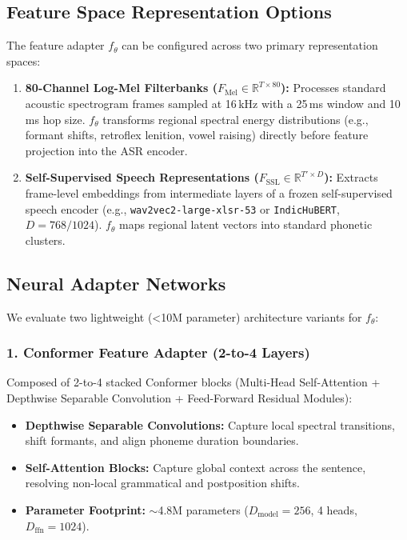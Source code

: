 \documentclass[11pt]{article}
\begin{document}
\subsection{Feature Space Representation Options}
The feature adapter $f_\theta$ can be configured across two primary representation spaces:
\begin{enumerate}[leftmargin=*]
  \item \textbf{80-Channel Log-Mel Filterbanks ($F_{\text{Mel}} \in \mathbb{R}^{T \times 80}$):}
    Processes standard acoustic spectrogram frames sampled at 16\,kHz with a 25\,ms window and 10\,ms hop size. $f_\theta$ transforms regional spectral energy distributions (e.g., formant shifts, retroflex lenition, vowel raising) directly before feature projection into the ASR encoder.
  \item \textbf{Self-Supervised Speech Representations ($F_{\text{SSL}} \in \mathbb{R}^{T' \times D}$):}
    Extracts frame-level embeddings from intermediate layers of a frozen self-supervised speech encoder (e.g., \texttt{wav2vec2-large-xlsr-53} or \texttt{IndicHuBERT}, $D=768 / 1024$). $f_\theta$ maps regional latent vectors into standard phonetic clusters.
\end{enumerate}

\subsection{Neural Adapter Networks}
We evaluate two lightweight (<10M parameter) architecture variants for $f_\theta$:

\subsubsection{1. Conformer Feature Adapter (2-to-4 Layers)}
Composed of 2-to-4 stacked Conformer blocks (Multi-Head Self-Attention + Depthwise Separable Convolution + Feed-Forward Residual Modules):
\begin{itemize}[leftmargin=*]
  \item \textbf{Depthwise Separable Convolutions:} Capture local spectral transitions, shift formants, and align phoneme duration boundaries.
  \item \textbf{Self-Attention Blocks:} Capture global context across the sentence, resolving non-local grammatical and postposition shifts.
  \item \textbf{Parameter Footprint:} $\sim$4.8M parameters ($D_{\text{model}} = 256$, 4 heads, $D_{\text{ffn}} = 1024$).
\end{itemize}
\end{document}
